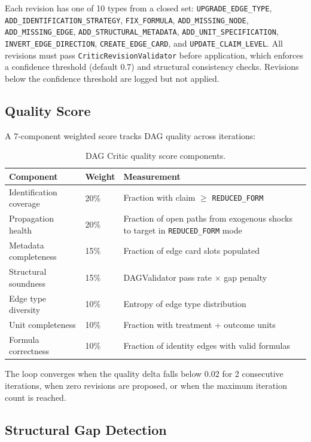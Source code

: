 \documentclass{article}
\begin{document}
Each revision has one of 10 types from a closed set: \texttt{UPGRADE\_EDGE\_TYPE}, \texttt{ADD\_IDENTIFICATION\_STRATEGY}, \texttt{FIX\_FORMULA}, \texttt{ADD\_MISSING\_NODE}, \texttt{ADD\_MISSING\_EDGE}, \texttt{ADD\_STRUCTURAL\_METADATA}, \texttt{ADD\_UNIT\_SPECIFICATION}, \texttt{INVERT\_EDGE\_DIRECTION}, \texttt{CREATE\_EDGE\_CARD}, and \texttt{UPDATE\_CLAIM\_LEVEL}. All revisions must pass \texttt{CriticRevisionValidator} before application, which enforces a confidence threshold (default 0.7) and structural consistency checks. Revisions below the confidence threshold are logged but not applied.

\subsection{Quality Score}

A 7-component weighted score tracks DAG quality across iterations:

\begin{table}[t]
\centering
\caption{DAG Critic quality score components.}
\label{tab:critic-quality}
\small
\begin{tabular}{@{}llp{5.5cm}@{}}
\toprule
\textbf{Component} & \textbf{Weight} & \textbf{Measurement} \\
\midrule
Identification coverage & 20\% & Fraction with claim $\geq$ \texttt{REDUCED\_FORM} \\
Propagation health & 20\% & Fraction of open paths from exogenous shocks to target in \texttt{REDUCED\_FORM} mode \\
Metadata completeness & 15\% & Fraction of edge card slots populated \\
Structural soundness & 15\% & DAGValidator pass rate $\times$ gap penalty \\
Edge type diversity & 10\% & Entropy of edge type distribution \\
Unit completeness & 10\% & Fraction with treatment + outcome units \\
Formula correctness & 10\% & Fraction of identity edges with valid formulas \\
\bottomrule
\end{tabular}
\end{table}

The loop converges when the quality delta falls below 0.02 for 2 consecutive iterations, when zero revisions are proposed, or when the maximum iteration count is reached.

\subsection{Structural Gap Detection}
\end{document}
